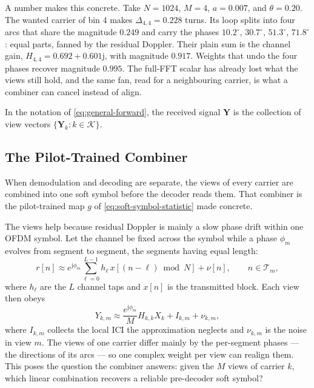 \documentclass[conference]{IEEEtran}
\newcommand{\Kset}{\mathcal{K}}
\begin{document}
A number makes this concrete.  Take \(N=1024\), \(M=4\), \(a=0.007\),
and \(\theta=0.20\).  The wanted carrier of bin \(4\) makes
\(\Delta_{4,4}=0.228\) turns.  Its loop splits into four arcs that share
the magnitude \(0.249\) and carry the phases \(10.2^\circ\),
\(30.7^\circ\), \(51.3^\circ\), \(71.8^\circ\): equal parts, fanned
by the residual Doppler.  Their plain sum is the channel gain,
\(H_{4,4}=0.692+0.601\mathrm j\), with magnitude \(0.917\).  Weights that undo
the four phases recover magnitude \(0.995\).  The full-FFT scalar has
already lost what the views still hold, and the same fan, read for a
neighbouring carrier, is what a combiner can cancel instead of align.

In the notation of \eqref{eq:general-forward}, the received signal
\(\mathbf Y\) is the collection of view vectors
\(\{\mathbf Y_k:k\in\Kset\}\).

\subsection{The Pilot-Trained Combiner}

When demodulation and decoding are separate, the views of every carrier are
combined into one soft symbol before the decoder reads them.  That combiner
is the pilot-trained map \(g\) of \eqref{eq:soft-symbol-statistic} made
concrete.

The views help because residual Doppler is mainly a slow phase drift within
one OFDM symbol.  Let the channel be fixed across the symbol while a phase
\(\phi_m\) evolves from segment to segment, the segments having equal
length:
\begin{equation}
  r[n]
  \approx
  e^{\mathrm j\phi_m}
  \sum_{\ell=0}^{L-1}h_\ell\,x[(n-\ell)\bmod N]+\nu[n],
  \qquad n\in\mathcal T_m,
  \label{eq:piecewise-phase}
\end{equation}
where \(h_\ell\) are the \(L\) channel taps and \(x[n]\) is the
transmitted block.  Each view then obeys
\begin{equation}
  Y_{k,m}
  \approx
  \frac{e^{\mathrm j\phi_m}}{M}H_{k,k}X_k + I_{k,m}+\nu_{k,m},
  \label{eq:view-phase-model}
\end{equation}
where \(I_{k,m}\) collects the local ICI the approximation neglects and
\(\nu_{k,m}\) is the noise in view \(m\).  The views of one carrier
differ mainly by the per-segment phases --- the directions of its arcs ---
so one complex weight per view can realign them.  This poses the question the combiner answers: given the
\(M\) views of carrier \(k\), which linear combination recovers a
reliable pre-decoder soft symbol?
\end{document}
